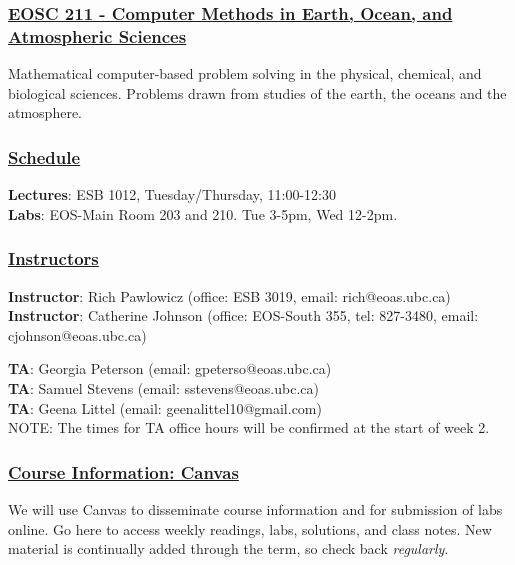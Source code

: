 \documentclass[12pt]{article}
\renewcommand{\section}[1]{\vspace{0pt}\subsubsection*{\underline{\large #1}}\vspace{-10pt}}
\begin{document}
\section{EOSC 211 - Computer Methods in Earth, Ocean, and Atmospheric Sciences}
 
Mathematical computer-based problem solving in the physical, 
chemical, and biological sciences. Problems drawn from studies of 
the earth, the oceans and the atmosphere. 

\section{Schedule}

{\bf Lectures}: ESB 1012, Tuesday/Thursday, 11:00-12:30 \\
{\bf Labs}: EOS-Main Room 203 and 210. Tue 3-5pm, Wed 12-2pm.

\section{Instructors}

{\bf Instructor}: Rich Pawlowicz (office: ESB 3019, 
email: rich@eoas.ubc.ca) \\
{\bf Instructor}:  Catherine Johnson    (office: EOS-South 355, tel: 827-3480, 
email: cjohnson@eoas.ubc.ca)  


 
{\bf TA}: Georgia Peterson (email: gpeterso@eoas.ubc.ca) \\
{\bf TA}: Samuel Stevens (email: sstevens@eoas.ubc.ca) \\
{\bf TA}: Geena Littel (email: geenalittel10@gmail.com) \\

NOTE:  The times for TA office hours will be confirmed at the start of week 2.

  
\section{Course Information:  Canvas}


We will use Canvas to disseminate course information and for submission of labs online.   Go here to access weekly readings, labs, solutions, and class notes.  New material is continually added through the term, so check back \emph{regularly}. 
\end{document}
